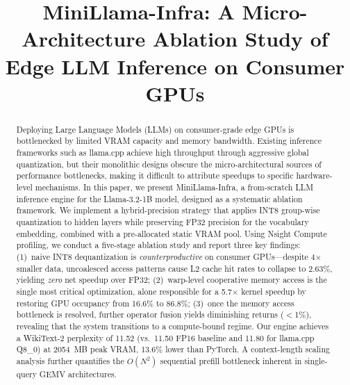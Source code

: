 \documentclass[conference]{IEEEtran}
\begin{document}
\title{MiniLlama-Infra: A Micro-Architecture Ablation Study of Edge LLM Inference on Consumer GPUs}

\author{
}

\maketitle

\begin{abstract}
Deploying Large Language Models (LLMs) on consumer-grade edge GPUs is bottlenecked by limited VRAM capacity and memory bandwidth. Existing inference frameworks such as llama.cpp achieve high throughput through aggressive global quantization, but their monolithic designs obscure the micro-architectural sources of performance bottlenecks, making it difficult to attribute speedups to specific hardware-level mechanisms. In this paper, we present MiniLlama-Infra, a from-scratch LLM inference engine for the Llama-3.2-1B model, designed as a systematic ablation framework. We implement a hybrid-precision strategy that applies INT8 group-wise quantization to hidden layers while preserving FP32 precision for the vocabulary embedding, combined with a pre-allocated static VRAM pool. Using Nsight Compute profiling, we conduct a five-stage ablation study and report three key findings: (1)~naive INT8 dequantization is \emph{counterproductive} on consumer GPUs---despite 4$\times$ smaller data, uncoalesced access patterns cause L2 cache hit rates to collapse to 2.63\%, yielding \emph{zero} net speedup over FP32; (2)~warp-level cooperative memory access is the single most critical optimization, alone responsible for a 5.7$\times$ kernel speedup by restoring GPU occupancy from 16.6\% to 86.8\%; (3)~once the memory access bottleneck is resolved, further operator fusion yields diminishing returns ($<$1\%), revealing that the system transitions to a compute-bound regime. Our engine achieves a WikiText-2 perplexity of 11.52 (vs.\ 11.50 FP16 baseline and 11.80 for llama.cpp Q8\_0) at 2054~MB peak VRAM, 13.6\% lower than PyTorch. A context-length scaling analysis further quantifies the $O(N^2)$ sequential prefill bottleneck inherent in single-query GEMV architectures.
\end{abstract}
\end{document}
